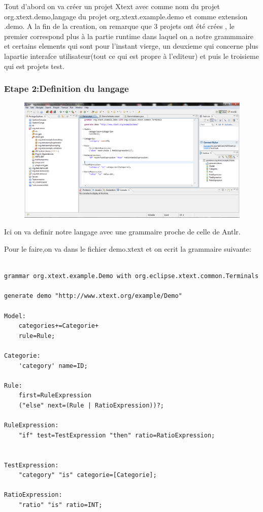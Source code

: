 \documentclass{article}
\begin{document}
Tout d'abord on va créer un projet Xtext avec comme nom du projet org.xtext.demo,langage du projet org.xtext.example.demo et comme extension .demo.
A la fin de la creation, on remarque que 3 projets ont été crées , le premier correspond plus à la partie runtime dans laquel on a notre grammmaire et certains elements qui sont pour l'instant vierge, un deuxieme qui concerne plus lapartie interafce utilisateur(tout ce qui est propre à l'editeur) et puis le troisieme qui est projets test.

\subsubsection{Etape 2:Definition du langage}

\begin{figure}[h]
	\centering
		\includegraphics[width=1.10\textwidth]{2.PNG}
	\label{fig:2}
\end{figure}\FloatBarrier


Ici on va definir notre langage  avec une grammaire proche de celle de Antlr.

Pour le faire,on va dans le fichier demo.xtext et on ecrit la grammaire suivante:

\begin{verbatim}

grammar org.xtext.example.Demo with org.eclipse.xtext.common.Terminals

generate demo "http://www.xtext.org/example/Demo"

Model:
	categories+=Categorie+
	rule=Rule;
	
Categorie:
	'category' name=ID;
	
Rule:
	first=RuleExpression
	("else" next=(Rule | RatioExpression))?;

RuleExpression:
	"if" test=TestExpression "then" ratio=RatioExpression;


TestExpression:
	"category" "is" categorie=[Categorie];

RatioExpression:
	"ratio" "is" ratio=INT;

\end{verbatim}
\end{document}
